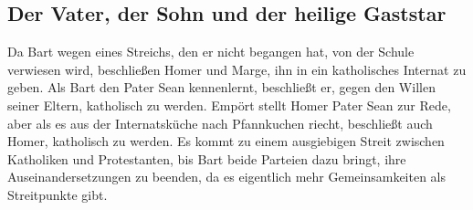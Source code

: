 
\subsection{Der Vater, der Sohn und der heilige Gaststar}\label{GABF09}
Da Bart wegen eines Streichs, den er nicht begangen hat, von der Schule verwiesen wird, beschließen Homer und Marge, ihn in ein katholisches Internat zu geben. Als Bart den Pater Sean kennenlernt, beschließt er, gegen den Willen seiner Eltern, katholisch zu werden. Empört stellt Homer Pater Sean zur Rede, aber als es aus der Internatsküche nach Pfannkuchen riecht, beschließt auch Homer, katholisch zu werden. Es kommt zu einem ausgiebigen Streit zwischen Katholiken und Protestanten, bis Bart beide Parteien dazu bringt, ihre Auseinandersetzungen zu beenden, da es eigentlich mehr Gemeinsamkeiten als Streitpunkte gibt.


